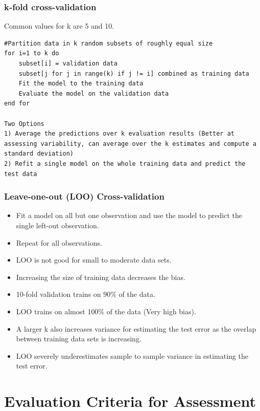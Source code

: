 \documentclass[12pt, oneside]{article}
\begin{document}
\subsubsection{k-fold cross-validation}
Common values for k are 5 and 10.
\begin{lstlisting}
#Partition data in k random subsets of roughly equal size
for i=1 to k do
    subset[i] = validation data
    subset[j for j in range(k) if j != i] combined as training data
    Fit the model to the training data
    Evaluate the model on the validation data
end for

Two Options
1) Average the predictions over k evaluation results (Better at assessing variability, can average over the k estimates and compute a standard deviation) 
2) Refit a single model on the whole training data and predict the test data
\end{lstlisting}

\subsubsection{Leave-one-out (LOO) Cross-validation}
\begin{itemize}
    \item Fit a model on all but one observation and use the model to predict the single left-out observation.
    \item Repeat for all observations. 
    \item LOO is not good for small to moderate data sets. 
    \item Increasing the size of training data decreases the bias. 
    \item 10-fold validation trains on 90\% of the data. 
    \item LOO trains on almost 100\% of the data (Very high bias).
    \item A larger k also increases variance for estimating the test error as the overlap between training data sets is increasing. 
    \item LOO severely underestimates sample to sample variance in estimating the test error. 
\end{itemize}
\section{Evaluation Criteria for Assessment}
\end{document}

